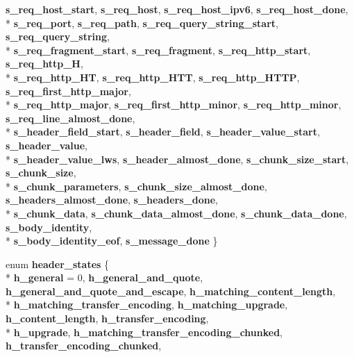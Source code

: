 \begin{DoxyCompactItemize}
{\bf s\+\_\+req\+\_\+host\+\_\+start}, 
{\bf s\+\_\+req\+\_\+host}, 
{\bf s\+\_\+req\+\_\+host\+\_\+ipv6}, 
{\bf s\+\_\+req\+\_\+host\+\_\+done}, 
\\*
{\bf s\+\_\+req\+\_\+port}, 
{\bf s\+\_\+req\+\_\+path}, 
{\bf s\+\_\+req\+\_\+query\+\_\+string\+\_\+start}, 
{\bf s\+\_\+req\+\_\+query\+\_\+string}, 
\\*
{\bf s\+\_\+req\+\_\+fragment\+\_\+start}, 
{\bf s\+\_\+req\+\_\+fragment}, 
{\bf s\+\_\+req\+\_\+http\+\_\+start}, 
{\bf s\+\_\+req\+\_\+http\+\_\+H}, 
\\*
{\bf s\+\_\+req\+\_\+http\+\_\+\+HT}, 
{\bf s\+\_\+req\+\_\+http\+\_\+\+H\+TT}, 
{\bf s\+\_\+req\+\_\+http\+\_\+\+H\+T\+TP}, 
{\bf s\+\_\+req\+\_\+first\+\_\+http\+\_\+major}, 
\\*
{\bf s\+\_\+req\+\_\+http\+\_\+major}, 
{\bf s\+\_\+req\+\_\+first\+\_\+http\+\_\+minor}, 
{\bf s\+\_\+req\+\_\+http\+\_\+minor}, 
{\bf s\+\_\+req\+\_\+line\+\_\+almost\+\_\+done}, 
\\*
{\bf s\+\_\+header\+\_\+field\+\_\+start}, 
{\bf s\+\_\+header\+\_\+field}, 
{\bf s\+\_\+header\+\_\+value\+\_\+start}, 
{\bf s\+\_\+header\+\_\+value}, 
\\*
{\bf s\+\_\+header\+\_\+value\+\_\+lws}, 
{\bf s\+\_\+header\+\_\+almost\+\_\+done}, 
{\bf s\+\_\+chunk\+\_\+size\+\_\+start}, 
{\bf s\+\_\+chunk\+\_\+size}, 
\\*
{\bf s\+\_\+chunk\+\_\+parameters}, 
{\bf s\+\_\+chunk\+\_\+size\+\_\+almost\+\_\+done}, 
{\bf s\+\_\+headers\+\_\+almost\+\_\+done}, 
{\bf s\+\_\+headers\+\_\+done}, 
\\*
{\bf s\+\_\+chunk\+\_\+data}, 
{\bf s\+\_\+chunk\+\_\+data\+\_\+almost\+\_\+done}, 
{\bf s\+\_\+chunk\+\_\+data\+\_\+done}, 
{\bf s\+\_\+body\+\_\+identity}, 
\\*
{\bf s\+\_\+body\+\_\+identity\+\_\+eof}, 
{\bf s\+\_\+message\+\_\+done}
 \}
\item 
enum {\bf header\+\_\+states} \{ \\*
{\bf h\+\_\+general} = 0, 
{\bf h\+\_\+general\+\_\+and\+\_\+quote}, 
{\bf h\+\_\+general\+\_\+and\+\_\+quote\+\_\+and\+\_\+escape}, 
{\bf h\+\_\+matching\+\_\+content\+\_\+length}, 
\\*
{\bf h\+\_\+matching\+\_\+transfer\+\_\+encoding}, 
{\bf h\+\_\+matching\+\_\+upgrade}, 
{\bf h\+\_\+content\+\_\+length}, 
{\bf h\+\_\+transfer\+\_\+encoding}, 
\\*
{\bf h\+\_\+upgrade}, 
{\bf h\+\_\+matching\+\_\+transfer\+\_\+encoding\+\_\+chunked}, 
{\bf h\+\_\+transfer\+\_\+encoding\+\_\+chunked}, 

\end{DoxyCompactItemize}
